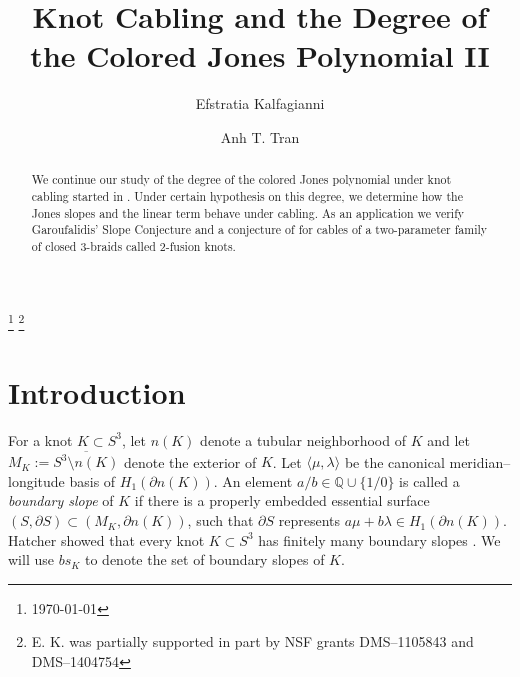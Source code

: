 \documentclass[11pt]{amsart}
\numberwithin{equation}{section}
\theoremstyle{plain}
\theoremstyle{definition}
\newcommand{\QQ}{{\mathbb{Q}}}
\newcommand{\bdy}{{\partial}}
\begin{document}
\title[]{Knot Cabling and the Degree of the Colored Jones Polynomial II}

\author[]{Efstratia Kalfagianni}
\address{Department of Mathematics, Michigan State University, East Lansing, MI, 48824}

\author[]{Anh T. Tran}
\address{Department of Mathematical Sciences, University of Texas at Dallas,  Richardson TX, 75080}

\begin{abstract} We continue our study of the degree of the colored Jones polynomial 
under knot cabling started in \cite{Effie-Anh-slope}. Under certain hypothesis on this degree, we determine how the Jones slopes and the linear term behave under cabling. As an application we verify Garoufalidis' Slope Conjecture and a conjecture of 
\cite{Effie-Anh-slope} for cables of a two-parameter family of closed 3-braids called  2-fusion knots.



\bigskip

\bigskip

\bigskip

\end{abstract}
\thanks {\today}
\thanks{E. K. was partially supported in part by NSF grants DMS--1105843 and DMS--1404754 }


\maketitle

\section{Introduction}

For a knot $K \subset S^3$, let $n(K)$ denote a tubular neighborhood of
$K$ and let $M_K:=\overline{ S^3\setminus n(K)}$ denote the exterior of
$K$. Let $\langle \mu, \lambda \rangle$ be the canonical
meridian--longitude basis of $H_1 (\bdy n(K))$.  An element $a/b \in
{\QQ}\cup \{ 1/0\}$ is called a \emph{boundary slope} of $K$ if there
is a properly embedded essential surface $(S, \bdy S) \subset (M_K,
\bdy n(K))$, such that  $\bdy S$ represents $a \mu + b \lambda \in
H_1 (\bdy n(K))$.  Hatcher showed that every knot $K \subset S^3$
has finitely many boundary slopes \cite{hatcher}.
We will use $bs_K$ to denote the set of boundary slopes of $K$.
\end{document}
